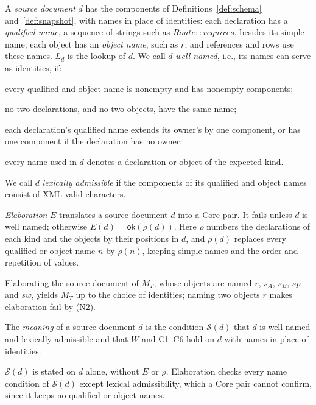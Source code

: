 \begin{definition}\label{def:document}
A \emph{source document} $d$ has the components of Definitions~\ref{def:schema}
and~\ref{def:snapshot}, with names in place of identities: each declaration has
a \emph{qualified name}, a sequence of strings such as
$\mathit{Route}{::}\mathit{requires}$, besides its simple name; each object has an
\emph{object name}, such as $r$; and references and rows use these names. $L_d$ is
the lookup of $d$. We call $d$ \emph{well named}, i.e., its names can serve as identities, if:
\begin{list}{}{\setlength{\leftmargin}{9mm}\setlength{\labelwidth}{8mm}%
 \setlength{\itemsep}{1pt}\setlength{\parsep}{0pt}\setlength{\topsep}{2pt}}
\item[(N1)] every qualified and object name is nonempty and has nonempty components;
\item[(N2)] no two declarations, and no two objects, have the same name;
\item[(N3)] each declaration's qualified name extends its owner's by one
 component, or has one component if the declaration has no owner;
\item[(N4)] every name used in $d$ denotes a declaration or object of the expected kind.
\end{list}
We call $d$ \emph{lexically admissible} if the components of its qualified and
object names consist of XML-valid characters.
\end{definition}

\begin{definition}[Elaboration]\label{def:elaboration}
\emph{Elaboration} $E$ translates a source document $d$ into a Core pair. It fails
unless $d$ is well named; otherwise $E(d)=\mathsf{ok}(\rho(d))$. Here $\rho$
numbers the declarations of each kind and the objects by their positions in $d$,
and $\rho(d)$ replaces every qualified or object name $n$ by $\rho(n)$, keeping
simple names and the order and repetition of values.
\end{definition}
Elaborating the source document of $M_T$, whose objects are named $r$, $s_A$,
$s_B$, $\mathit{sp}$ and $\mathit{sw}$, yields $M_T$ up to the choice of
identities; naming two objects $r$ makes elaboration fail by (N2).

\begin{definition}\label{def:meaning}
The \emph{meaning} of a source document $d$ is the condition $\mathcal S(d)$ that
$d$ is well named and lexically admissible and that $W$ and C1--C6 hold on $d$
with names in place of identities.
\end{definition}
$\mathcal S(d)$ is stated on $d$ alone, without $E$ or $\rho$. Elaboration checks every name condition of $\mathcal S(d)$ except lexical
admissibility, which a Core pair cannot confirm, since it keeps no qualified or
object names.

